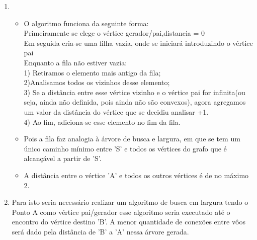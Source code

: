 \documentclass[11pt,reqno]{amsart}
\begin{document}
\begin{enumerate}
\item 
\begin{itemize}
	\item O algoritmo funciona da seguinte forma:\\Primeiramente se elege o vértice gerador/pai,distancia = 0\\Em seguida cria-se uma 
	filha vazia, onde se iniciará introduzindo o vértice pai\\Enquanto a fila não estiver vazia:\\ 1) Retiramos o elemento mais antigo 
	da fila;\\ 2)Analisamos todos os vizinhos desse elemento;\\ 3) Se a distância entre esse vértice vizinho e o vértice pai for 
	infinita(ou seja, ainda não definida, pois ainda não são convexos), agora agregamos um valor da distância do vértice que se 
	decidiu analisar +1.\\ 4) Ao fim, adiciona-se esse elemento no fim da fila.
	\item Pois a fila faz analogia à árvore de busca e largura, em que se tem um único caminho mínimo entre 'S' e todos os vértices do 
	grafo que é alcançável a partir de 'S'.
	\item A distância entre o vértice 'A' e todos os outros vértices é de no máximo 2.
\end{itemize}
\vspace{0.3cm}{}
{}
\item Para isto seria necessário realizar um algoritmo de busca em largura tendo o Ponto A como vértice pai/gerador esse algoritmo 
seria executado até o encontro do vértice destino 'B'. A menor quantidade de conexões entre vôos será dado pela distância de 'B' a 'A' 
nessa árvore gerada.




\end{enumerate}
\end{document}
